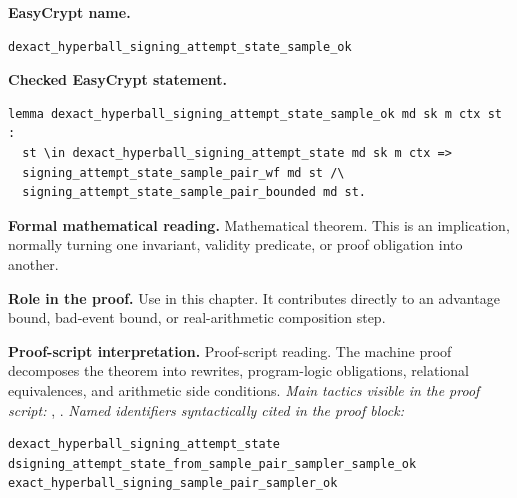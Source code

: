 \begin{formaltheorem}
\noindent\textbf{EasyCrypt name.}
\begin{lstlisting}[language=EasyCrypt,basicstyle=\ttfamily\scriptsize]
dexact_hyperball_signing_attempt_state_sample_ok
\end{lstlisting}
\noindent\textbf{Checked EasyCrypt statement.}
\begin{lstlisting}[language=EasyCrypt,basicstyle=\ttfamily\scriptsize]
lemma dexact_hyperball_signing_attempt_state_sample_ok md sk m ctx st :
  st \in dexact_hyperball_signing_attempt_state md sk m ctx =>
  signing_attempt_state_sample_pair_wf md st /\
  signing_attempt_state_sample_pair_bounded md st.
\end{lstlisting}
\noindent\textbf{Formal mathematical reading.}
Mathematical theorem. This is an implication, normally turning one invariant, validity predicate, or proof obligation into another.

\noindent\textbf{Role in the proof.}
Use in this chapter. It contributes directly to an advantage bound, bad-event bound, or real-arithmetic composition step.

\noindent\textbf{Proof-script interpretation.}
Proof-script reading. The machine proof decomposes the theorem into rewrites, program-logic obligations, relational equivalences, and arithmetic side conditions.
\emph{Main tactics visible in the proof script:} \ec{rewrite}, \ec{apply}.
\emph{Named identifiers syntactically cited in the proof block:}
\begin{lstlisting}[language=EasyCrypt,basicstyle=\ttfamily\scriptsize]
dexact_hyperball_signing_attempt_state
dsigning_attempt_state_from_sample_pair_sampler_sample_ok
exact_hyperball_signing_sample_pair_sampler_ok
\end{lstlisting}

\end{formaltheorem}


